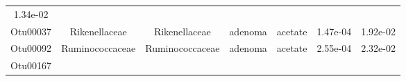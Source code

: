 \documentclass[11pt,]{article}
\begin{document}
\begin{longtable}[]{@{}ccccccc@{}}
\begin{minipage}[t]{0.09\columnwidth}
1.34e-02\strut
\end{minipage}\tabularnewline
\begin{minipage}[t]{0.09\columnwidth}\centering\strut
Otu00037\strut
\end{minipage} & \begin{minipage}[t]{0.17\columnwidth}\centering\strut
Rikenellaceae\strut
\end{minipage} & \begin{minipage}[t]{0.17\columnwidth}\centering\strut
Rikenellaceae\strut
\end{minipage} & \begin{minipage}[t]{0.09\columnwidth}\centering\strut
adenoma\strut
\end{minipage} & \begin{minipage}[t]{0.11\columnwidth}\centering\strut
acetate\strut
\end{minipage} & \begin{minipage}[t]{0.09\columnwidth}\centering\strut
1.47e-04\strut
\end{minipage} & \begin{minipage}[t]{0.09\columnwidth}\centering\strut
1.92e-02\strut
\end{minipage}\tabularnewline
\begin{minipage}[t]{0.09\columnwidth}\centering\strut
Otu00092\strut
\end{minipage} & \begin{minipage}[t]{0.17\columnwidth}\centering\strut
Ruminococcaceae\strut
\end{minipage} & \begin{minipage}[t]{0.17\columnwidth}\centering\strut
Ruminococcaceae\strut
\end{minipage} & \begin{minipage}[t]{0.09\columnwidth}\centering\strut
adenoma\strut
\end{minipage} & \begin{minipage}[t]{0.11\columnwidth}\centering\strut
acetate\strut
\end{minipage} & \begin{minipage}[t]{0.09\columnwidth}\centering\strut
2.55e-04\strut
\end{minipage} & \begin{minipage}[t]{0.09\columnwidth}\centering\strut
2.32e-02\strut
\end{minipage}\tabularnewline
\begin{minipage}[t]{0.09\columnwidth}\centering\strut
Otu00167\strut
\end{minipage} & \begin{minipage}[t]{0.17\columnwidth}\centering\strut

\end{minipage}
\end{longtable}
\end{document}
